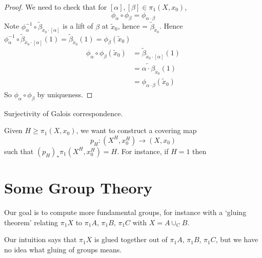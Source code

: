 \documentclass{article}
\numberwithin{nthm}{subsection}
\begin{document}
\begin{proof}
    We need to check that for $[\alpha], [\beta] \in \pi_1(X, x_0)$,
    \begin{equation*}
        \phi_\alpha \circ \phi_\beta = \phi_{\alpha \cdot \beta}
    \end{equation*}
    Note $\phi_\alpha^{-1} \circ \widetilde{\beta}_{\widetilde{x}_0 \cdot [\alpha]}$ is a lift of $\beta$ at $\widetilde{x}_0$, hence = $\widetilde{\beta}_{\widetilde{x}_0}$.
    Hence $\phi_\alpha^{-1} \circ \widetilde{\beta}_{\widetilde{x}_0 \cdot [\alpha]}(1) =\widetilde{\beta}_{\widetilde{x}_0}(1) = \phi_\beta (\widetilde{x}_0)$
    \begin{align*}
        \phi_\alpha \circ \phi_\beta (\widetilde{x}_0) &= \widetilde{\beta}_{\widetilde{x}_0 \cdot [\alpha]}(1) \\
                                                       &= \widetilde{\alpha \cdot \beta}_{\widetilde{x}_0} (1) \\
                                                       &= \phi_{\alpha \cdot \beta}(\widetilde{x}_0)
    \end{align*}
    So $\phi_\alpha \circ \phi_\beta$ by uniqueness.
\end{proof}

Surjectivity of Galois correspondence.

Given $H \geq \pi_1(X, x_0)$, we want to construct a covering map
\begin{equation*}
    p_H:(X^H, x_0^H) \to (X, x_0)
\end{equation*}
such that $(p_H)_* \pi_1(X^H, x_0^H) = H$. For instance, if $H = 1$ then


\clearpage
\section{Some Group Theory}
Our goal is to compute more fundamental groups, for instance with a `gluing theorem' relating $\pi_1 X$ to $\pi_1 A$, $\pi_1 B$, $\pi_1 C$ with $X = A \cup_C B$.
\begin{center}
\end{center}
Our intuition says that $\pi_1 X$ is glued together out of  $\pi_1 A$, $\pi_1 B$, $\pi_1 C$, but we have no idea what gluing of groups means.
\end{document}

